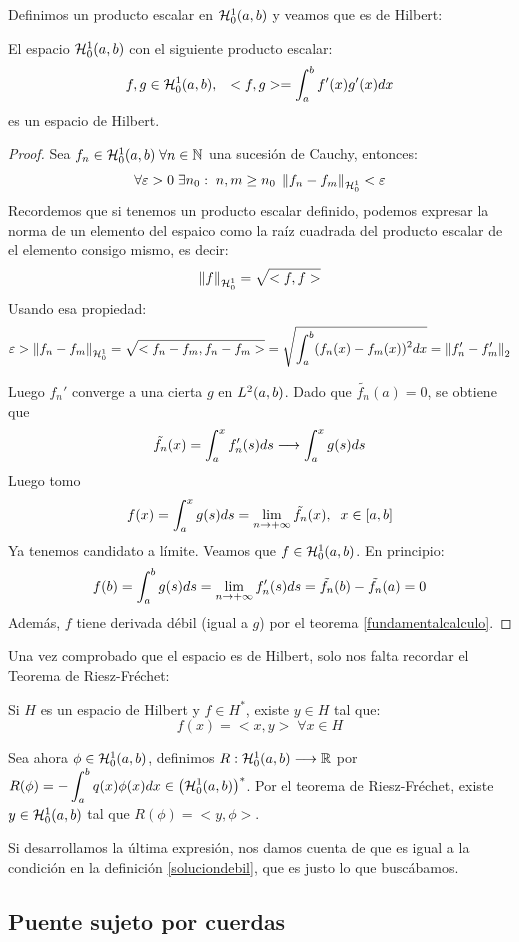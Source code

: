 Definimos un producto escalar en $\sobolevcero[a,b]{1}$ y veamos que es de Hilbert:
\begin{prop}
El espacio $\sobolevcero[a,b]{1}$ con el siguiente producto escalar:
\[
f,g\in\sobolevcero[a,b]{1}, \espacio <f,g>=\integral{a}{b}{f'(x)g'(x)dx}
\]
es un espacio de Hilbert.
\end{prop}
\begin{proof}
Sea $f_n\in\sobolevcero{1} \;\forall n\in\N$ una sucesión de Cauchy, entonces:
\[
\forall \varepsilon>0 \; \exists n_0: \; n,m\geq n_0 \; \normasobolevcero{1}{f_n-f_m}<\varepsilon
\]
Recordemos que si tenemos un producto escalar definido, podemos expresar la norma de un elemento del espaico como la raíz cuadrada del producto escalar de el elemento consigo mismo, es decir:
\[
\normasobolevcero{1}{f}=\sqrt{<f,f>}
\]
Usando esa propiedad:
\[
\varepsilon > \normasobolevcero{1}{f_n-f_m}=\sqrt{<f_n-f_m,f_n-f_m>}=\sqrt{\integral{a}{b}{(f_n(x)-f_m(x))^2dx}}=\norm{f_n'-f_m'}_2
\]

Luego $f_n'$ converge a una cierta $g$ en $\lebesgue{2}$. Dado que $\tilde{f_n}(a)=0$, se obtiene que
\[
\tilde{f_n}(x)=\integral{a}{x}{f'_n(s)ds}\longrightarrow\integral{a}{x}{g(s)ds}
\]
Luego tomo
\[
f(x)=\integral{a}{x}{g(s)ds}=\limitemasinfinito{n}{\tilde{f_n}(x)}, \;\; x \in[a,b]
\]
Ya tenemos candidato a límite. Veamos que $f\in\sobolevcero{1}$. En principio:
\[
f(b)=\integral{a}{b}{g(s)ds}=\limitemasinfinito{n}{f'_n(s)ds}=\tilde{f_n}(b)-\tilde{f_n}(a)=0
\]
Además, $f$ tiene derivada débil (igual a $g$) por el teorema \ref{fundamentalcalculo}.
\end{proof}

Una vez comprobado que el espacio es de Hilbert, solo nos falta recordar el Teorema de Riesz-Fréchet:
\begin{theorem}
\label{riesz-frechet}
Si $H$ es un espacio de Hilbert y $f\in H^*$, existe $y\in H$ tal que:
\[
f(x)=<x,y> \; \forall x\in H
\]
\end{theorem}

Sea ahora $\phi\in\sobolevcero{1}$, definimos $\funcion{R}{\sobolevcero{1}}{\R}$ por $R(\phi)=-\integral{a}{b}{q(x)\phi(x)dx}\in\left(\sobolevcero{1}\right)^*$. Por el teorema de Riesz-Fréchet, existe $y\in\sobolevcero{1}$ tal que $R(\phi)=<y,\phi>$.

Si desarrollamos la última expresión, nos damos cuenta de que es igual a la condición en la definición \ref{soluciondebil}, que es justo lo que buscábamos.

\subsection{Puente sujeto por cuerdas}

